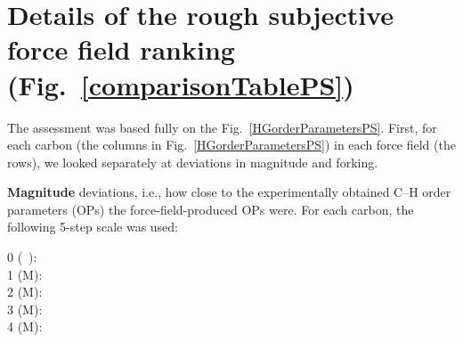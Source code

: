 \documentclass[journal=jpcbfk]{achemso}
\begin{document}
\pagebreak
\section{Details of the rough subjective force field ranking (Fig.~\ref{comparisonTablePS})} 

The assessment was based fully on the Fig.~\ref{HGorderParametersPS}.
%
First, for each carbon (the columns in Fig.~\ref{HGorderParametersPS}) in each force field (the rows),
we looked separately at deviations in magnitude and forking.

{\bf Magnitude} deviations, i.e., how close to the experimentally obtained C--H order parameters (OPs)
the force-field-produced OPs were.
%
For each carbon, the following 5-step scale was used:
%
\begin{description}
\item [0 (~):] 
%
\item [1 ({\textsf{\tiny M}}):] 
%
\item [2  ({\textsf{\small M}}):] 
%
\item [3 ({\textsf{\large M}}):] 
%
\item [4 ({\textsf{\Large M}}):] 
\end{description}
\end{document}

